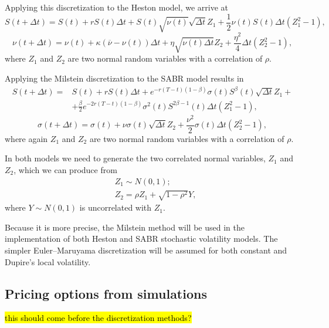 Applying this discretization to the Heston model, we arrive at
\begin{equation}
S(t+\Delta t)=S(t)+rS(t)\Delta t+S(t)\sqrt{\nu(t)}\sqrt{\Delta t}Z_1+\frac{1}{2}\nu(t)S(t)\Delta t(Z_1^2-1),
\end{equation}
\begin{equation}
\nu(t+\Delta t)=\nu(t)+\kappa(\overline{\nu}-\nu(t))\Delta t+\eta\sqrt{\nu(t)\Delta t}Z_2+\frac{\eta^2}{4}\Delta t(Z_2^2-1),
\end{equation}
\noindent where $Z_1$ and $Z_2$ are two normal random variables with a correlation of $\rho$.


Applying the Milstein discretization to the SABR model results in
\begin{equation}
\begin{split}
S(t+\Delta t)=&S(t)+rS(t)\Delta t+e^{-r(T-t)(1-\beta)}\sigma(t)S^\beta(t)\sqrt{\Delta t}Z_1+\\
&+\frac{\beta}{2}e^{-2r(T-t)(1-\beta)}\sigma^2(t)S^{2\beta-1}(t)\Delta t(Z_1^2-1),
\end{split}
\end{equation}
\begin{equation}
\sigma(t+\Delta t)=\sigma(t)+\nu\sigma(t)\sqrt{\Delta t}Z_2+\frac{\nu^2}{2}\sigma(t)\Delta t(Z_2^2-1),
\end{equation}
\noindent where again $Z_1$ and $Z_2$ are two normal random variables with a correlation of $\rho$.

In both models we need to generate the two correlated normal variables, $Z_1$ and $Z_2$, which we can produce from
\begin{equation}\label{normcorr}
\begin{split}
&Z_1\sim N(0,1);\\
&Z_2=\rho Z_1+\sqrt{1-\rho^2}Y,
\end{split}
\end{equation}
\noindent where $Y\sim N(0,1)$ is uncorrelated with $Z_1$.

Because it is more precise, the Milstein method will be used in the implementation of both Heston and SABR stochastic volatility models. The simpler Euler–Maruyama discretization will be assumed for both constant and Dupire's local volatility.


\subsection{Pricing options from simulations}
\hl{this should come before the discretization methods?}

